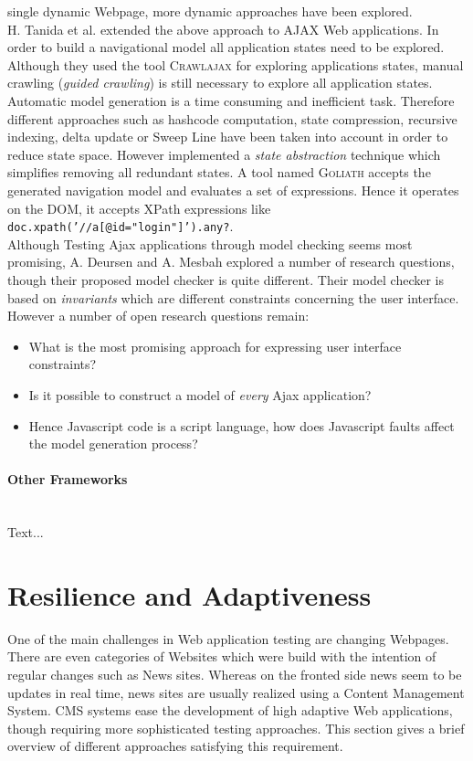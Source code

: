\documentclass[12pt, notitlepage]{article}
\begin{document}
single dynamic Webpage, more dynamic approaches have been explored.\\
H. Tanida et al.\cite{dynamic-testing-web-applications} extended the above approach to AJAX Web applications. In order to build a navigational model all 
application states need to be explored. Although they used the tool \textsc{Crawlajax}\cite{crawlajax} for exploring applications states, manual
crawling (\textit{guided crawling}) is still necessary to explore all application states. Automatic model generation is a time consuming and inefficient task. 
Therefore different approaches such as hashcode computation, state compression, recursive indexing\cite{recursive-indexing}, delta update or Sweep
Line\cite{sweep-line} have been taken into account in order to reduce state space\cite{state-space-reduction}. However \cite{dynamic-testing-web-applications}
implemented a \textit{state abstraction} technique which simplifies removing all redundant states. A tool
named \textsc{Goliath} accepts the generated navigation model and evaluates a set of expressions. Hence it operates on the DOM, it accepts XPath expressions like \texttt{doc.xpath('//a[@id="login"]').any?}. \\
Although Testing Ajax applications through model checking seems most promising, A. Deursen and A. Mesbah\cite{research-issues-model-checking-ajax} explored
a number of research questions, though their proposed model checker is quite different. Their model checker\cite{atusa} is based on \textit{invariants} which are
different constraints concerning the user interface. However a number of open research questions remain:
\begin{itemize}
	\item What is the most promising approach for expressing user interface constraints?
	\item Is it possible to construct a model of \textit{every} Ajax application?
	\item Hence Javascript code is a script language, how does Javascript faults affect the model generation process?
\end{itemize}
\paragraph{Other Frameworks} ~\\
Text...

\section{Resilience and Adaptiveness}
One of the main challenges in Web application testing are changing Webpages. There are even categories of Websites which were build with the intention of regular
changes such as News sites. Whereas on the fronted side news seem to be updates in real time, news sites are usually realized using a Content Management System. 
CMS systems ease the development of high adaptive Web applications, though requiring more sophisticated testing approaches. This section gives a brief overview 
of different approaches satisfying this requirement. 
\end{document}
